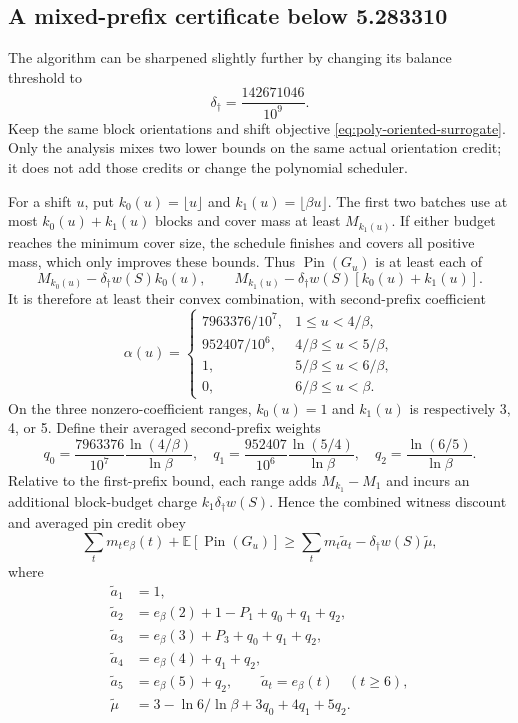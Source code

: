 \subsection{A mixed-prefix certificate below 5.283310}

The algorithm can be sharpened slightly further by changing its balance
threshold to
\[
 \delta_\dagger=\frac{142671046}{10^9}.
\]
Keep the same block orientations and shift objective
\eqref{eq:poly-oriented-surrogate}. Only the analysis mixes two lower
bounds on the same actual orientation credit; it does not add those
credits or change the polynomial scheduler.

For a shift $u$, put $k_0(u)=\lfloor u\rfloor$ and
$k_1(u)=\lfloor\beta u\rfloor$. The first two batches use at most
$k_0(u)+k_1(u)$ blocks and cover mass at least $M_{k_1(u)}$.
If either budget reaches the minimum cover size, the schedule finishes
and covers all positive mass, which only improves these bounds.
Thus $\operatorname{Pin}(G_u)$ is at least each of
\[
 M_{k_0(u)}-\delta_\dagger w(S)k_0(u),\qquad
 M_{k_1(u)}-\delta_\dagger w(S)[k_0(u)+k_1(u)].
\]
It is therefore at least their convex combination, with second-prefix
coefficient
\[
 \alpha(u)=
 \begin{cases}
 7963376/10^7,&1\le u<4/\beta,\\
 952407/10^6,&4/\beta\le u<5/\beta,\\
 1,&5/\beta\le u<6/\beta,\\
 0,&6/\beta\le u<\beta.
 \end{cases}
\]
On the three nonzero-coefficient ranges, $k_0(u)=1$ and $k_1(u)$ is
respectively 3, 4, or 5. Define their averaged second-prefix weights
\[
 q_0=\frac{7963376}{10^7}\frac{\ln(4/\beta)}{\ln\beta},\quad
 q_1=\frac{952407}{10^6}\frac{\ln(5/4)}{\ln\beta},\quad
 q_2=\frac{\ln(6/5)}{\ln\beta}.
\]
Relative to the first-prefix bound, each range adds $M_{k_1}-M_1$
and incurs an additional block-budget charge $k_1\delta_\dagger w(S)$.
Hence the combined witness discount and averaged pin credit obey
\[
 \sum_t m_t e_\beta(t)+\mathbb E[\operatorname{Pin}(G_u)]
 \ge\sum_t m_t\widetilde a_t-\delta_\dagger w(S)\widetilde\mu,
\]
where
\[
 \begin{aligned}
 \widetilde a_1&=1,\\
 \widetilde a_2&=e_\beta(2)+1-P_1+q_0+q_1+q_2,\\
 \widetilde a_3&=e_\beta(3)+P_3+q_0+q_1+q_2,\\
 \widetilde a_4&=e_\beta(4)+q_1+q_2,\\
 \widetilde a_5&=e_\beta(5)+q_2,\qquad
 \widetilde a_t=e_\beta(t)\quad(t\ge6),\\
 \widetilde\mu&=3-\ln6/\ln\beta+3q_0+4q_1+5q_2.
 \end{aligned}
\]
